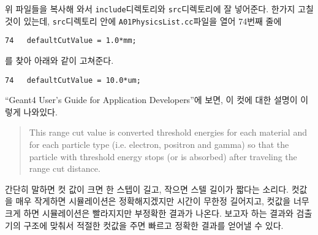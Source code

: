 위 파일들을 복사해 와서 \texttt{include}디렉토리와 \texttt{src}디렉토리에 잘
넣어준다. 한가지 고칠 것이 있는데, \texttt{src}디렉토리 안에
\texttt{A01PhysicsList.cc}파일을 열어 74번째 줄에
\begin{pc}
\begin{lstlisting}
74   defaultCutValue = 1.0*mm;
\end{lstlisting}
\end{pc}
를 찾아 아래와 같이 고쳐준다.
\begin{pc}
\begin{lstlisting}
74   defaultCutValue = 10.0*um;
\end{lstlisting}
\end{pc}
``Geant4 User's Guide for Application Developers''에 보면, 이 컷에 대한 설명이
이렇게 나와있다.
\begin{quote}
This range cut value is converted threshold energies for each material and for
each particle type (i.e. electron, positron and gamma) so that the particle
with threshold energy stops (or is absorbed) after traveling the range cut
distance.
\end{quote}
간단히 말하면 컷 값이 크면 한 스텝이 길고, 작으면 스텔 길이가 짧다는 소리다.
컷값을 매우 작게하면 시뮬레이션은 정확해지겠지만 시간이 무한정 길어지고, 컷값을
너무 크게 하면 시뮬레이션은 빨라지지만 부정확한 결과가 나온다. 보고자 하는
결과와 검출기의 구조에 맞춰서 적절한 컷값을 주면 빠르고 정확한 결과를 얻어낼 수
있다.

